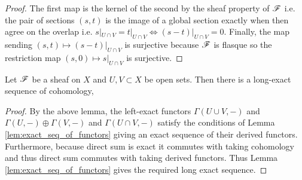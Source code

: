 \documentclass[12pt]{article}
\begin{document}
\begin{proof}
The first map is the kernel of the second by the sheaf property of $\mathscr{F}$ i.e. the pair of sections $(s, t)$ is the image of a global section exactly when then agree on the overlap i.e. $s|_{U \cap V} = t|_{U \cap V} \iff (s - t)|_{U \cap V} = 0$. Finally, the map sending $(s, t) \mapsto (s - t)|_{U \cap V}$ is surjective because $\mathscr{F}$ is flasque so the restriction map $(s, 0) \mapsto s|_{U \cap V}$ is surjective. 
\end{proof}

\begin{theorem}
Let $\mathscr{F}$ be a sheaf on $X$ and $U, V \subset X$ be open sets. Then there is a long-exact sequence of cohomology, 
\begin{center}
\end{center}
\end{theorem}

\begin{proof}
By the above lemma, the left-exact functors $\Gamma(U \cup V, -)$ and $\Gamma(U, -) \oplus \Gamma(V, -)$ and $\Gamma(U \cap V, -)$ satisfy the conditions of Lemma \ref{lem:exact_seq_of_functors} giving an exact sequence of their derived functors. Furthermore, because direct sum is exact it commutes with taking cohomology and thus direct sum commutes with taking derived functors. Thus Lemma \ref{lem:exact_seq_of_functors} gives the required long exact sequence. 
\end{proof}
\end{document}
